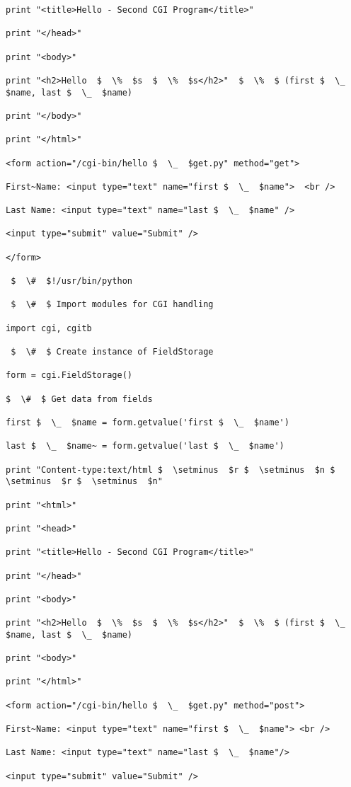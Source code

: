 \begin{enumerate}
\begin{enumerate}
\begin{verbatim}
print "<title>Hello - Second CGI Program</title>"

print "</head>"

print "<body>"

print "<h2>Hello  $  \%  $s  $  \%  $s</h2>"  $  \%  $ (first $  \_  $name, last $  \_  $name)

print "</body>"

print "</html>"

<form action="/cgi-bin/hello $  \_  $get.py" method="get">

First~Name: <input type="text" name="first $  \_  $name">  <br />

Last Name: <input type="text" name="last $  \_  $name" />

<input type="submit" value="Submit" />

</form>

 $  \#  $!/usr/bin/python

 $  \#  $ Import modules for CGI handling

import cgi, cgitb

 $  \#  $ Create instance of FieldStorage

form = cgi.FieldStorage()

$  \#  $ Get data from fields

first $  \_  $name = form.getvalue('first $  \_  $name')

last $  \_  $name~ = form.getvalue('last $  \_  $name')

print "Content-type:text/html $  \setminus  $r $  \setminus  $n $  \setminus  $r $  \setminus  $n"

print "<html>"

print "<head>"

print "<title>Hello - Second CGI Program</title>"

print "</head>"

print "<body>"

print "<h2>Hello  $  \%  $s  $  \%  $s</h2>"  $  \%  $ (first $  \_  $name, last $  \_  $name)

print "<body>"

print "</html>"

<form action="/cgi-bin/hello $  \_  $get.py" method="post">

First~Name: <input type="text" name="first $  \_  $name"> <br />

Last Name: <input type="text" name="last $  \_  $name"/>

<input type="submit" value="Submit" />


\end{verbatim}
\end{enumerate}
\end{enumerate}
